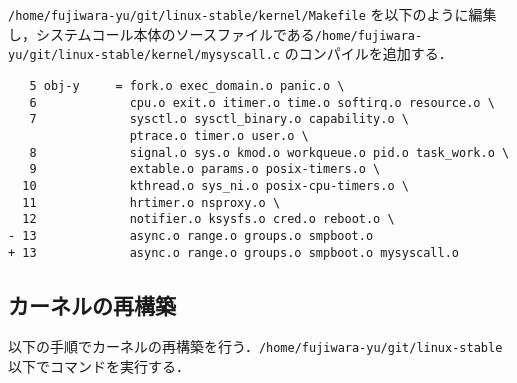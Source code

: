 \documentclass[12pt]{jsarticle}
\begin{document}
\begin{enumerate}
\verb|/home/fujiwara-yu/git/linux-stable/kernel/Makefile| を以下のように編集し，システムコール本体のソースファイルである\verb|/home/fujiwara-yu/git/linux-stable/kernel/mysyscall.c| のコンパイルを追加する．
\begin{verbatim}
   5 obj-y     = fork.o exec_domain.o panic.o \
   6             cpu.o exit.o itimer.o time.o softirq.o resource.o \
   7             sysctl.o sysctl_binary.o capability.o \
                 ptrace.o timer.o user.o \
   8             signal.o sys.o kmod.o workqueue.o pid.o task_work.o \
   9             extable.o params.o posix-timers.o \
  10             kthread.o sys_ni.o posix-cpu-timers.o \
  11             hrtimer.o nsproxy.o \
  12             notifier.o ksysfs.o cred.o reboot.o \
- 13             async.o range.o groups.o smpboot.o
+ 13             async.o range.o groups.o smpboot.o mysyscall.o
\end{verbatim}



\end{enumerate}

\subsection{カーネルの再構築}
以下の手順でカーネルの再構築を行う．\verb|/home/fujiwara-yu/git/linux-stable|以下でコマンドを実行する．
\end{document}
